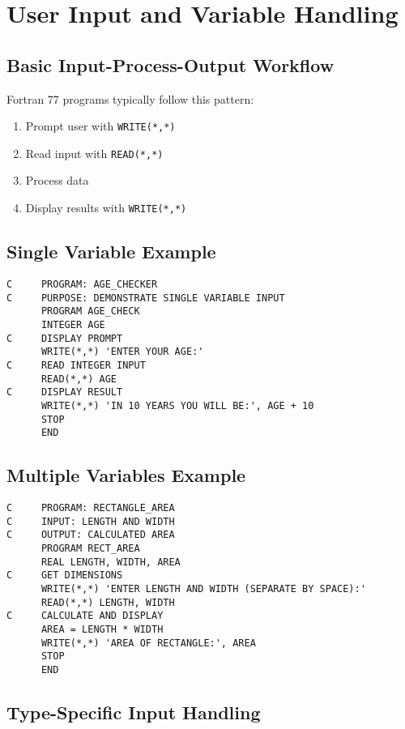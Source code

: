 \documentclass{book}
\begin{document}
\section{User Input and Variable Handling}

\subsection*{Basic Input-Process-Output Workflow}
Fortran 77 programs typically follow this pattern:
\begin{enumerate}
    \item Prompt user with \texttt{WRITE(*,*)}
    \item Read input with \texttt{READ(*,*)}
    \item Process data
    \item Display results with \texttt{WRITE(*,*)}
\end{enumerate}

\subsection*{Single Variable Example}
\begin{verbatim}
C     PROGRAM: AGE_CHECKER
C     PURPOSE: DEMONSTRATE SINGLE VARIABLE INPUT
      PROGRAM AGE_CHECK
      INTEGER AGE
C     DISPLAY PROMPT
      WRITE(*,*) 'ENTER YOUR AGE:'
C     READ INTEGER INPUT
      READ(*,*) AGE
C     DISPLAY RESULT
      WRITE(*,*) 'IN 10 YEARS YOU WILL BE:', AGE + 10
      STOP
      END
\end{verbatim}

\subsection*{Multiple Variables Example}
\begin{verbatim}
C     PROGRAM: RECTANGLE_AREA
C     INPUT: LENGTH AND WIDTH
C     OUTPUT: CALCULATED AREA
      PROGRAM RECT_AREA
      REAL LENGTH, WIDTH, AREA
C     GET DIMENSIONS
      WRITE(*,*) 'ENTER LENGTH AND WIDTH (SEPARATE BY SPACE):'
      READ(*,*) LENGTH, WIDTH
C     CALCULATE AND DISPLAY
      AREA = LENGTH * WIDTH
      WRITE(*,*) 'AREA OF RECTANGLE:', AREA
      STOP
      END
\end{verbatim}

\subsection*{Type-Specific Input Handling}
\end{document}

